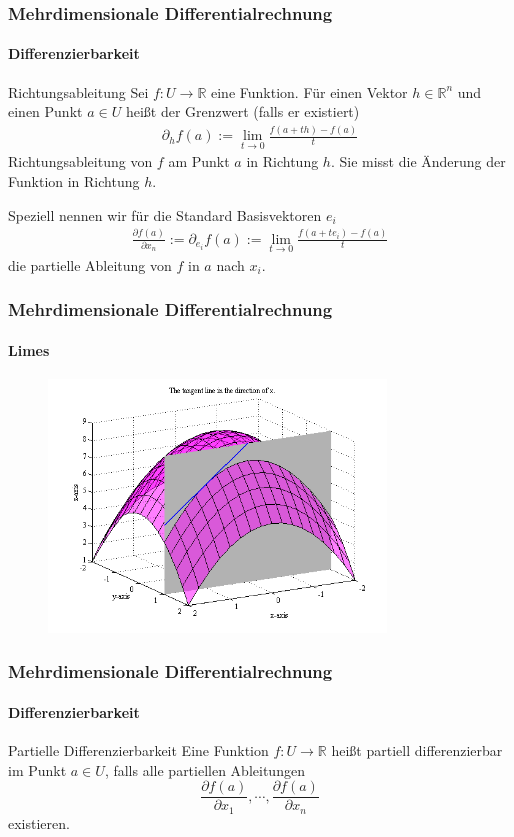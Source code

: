 \documentclass{beamer}
\begin{document}
\begin{frame}
    \frametitle{Mehrdimensionale Differentialrechnung}
\framesubtitle{Differenzierbarkeit}
    \begin{block}{Richtungsableitung}
Sei $f: U \to \mathbb{R}$ eine Funktion. Für einen Vektor $h \in  \mathbb{R}^n$  und einen Punkt  $a \in U$ heißt der Grenzwert (falls er existiert) 
\begin{align*}
\partial_h f(a) := \lim_{t \to 0} \frac{f(a + th) - f(a)}{t}
\end{align*}
Richtungsableitung von $f$ am Punkt $a$ in Richtung $h$. Sie misst die Änderung der Funktion in Richtung $h$.

Speziell nennen wir für die Standard Basisvektoren $e_i$ 
\begin{align*}
\frac{\partial f(a)}{\partial x_n}  := \partial_{e_i} f(a) := \lim_{t \to 0} \frac{f(a + t e_i) - f(a)}{t}
\end{align*}
die partielle Ableitung von $f$ in $a$ nach $x_i$.
\end{block}


 \end{frame}



\begin{frame}
    \frametitle{Mehrdimensionale Differentialrechnung}
\framesubtitle{Limes}

\begin{figure}[H]
      \centering
    \includegraphics[width=0.8\textwidth]{images/diffable}
\end{figure}

 \end{frame}

\begin{frame}
    \frametitle{Mehrdimensionale Differentialrechnung}
\framesubtitle{Differenzierbarkeit}
    \begin{block}{Partielle Differenzierbarkeit }
Eine Funktion  $f: U \to \mathbb{R}$ heißt partiell differenzierbar im Punkt $a \in U$, falls alle partiellen Ableitungen 
$$\frac{\partial f(a)}{\partial x_1}, \cdots , \frac{\partial f(a)}{\partial x_n}$$ 
existieren.
\end{block}
 \end{frame}
\end{document}
